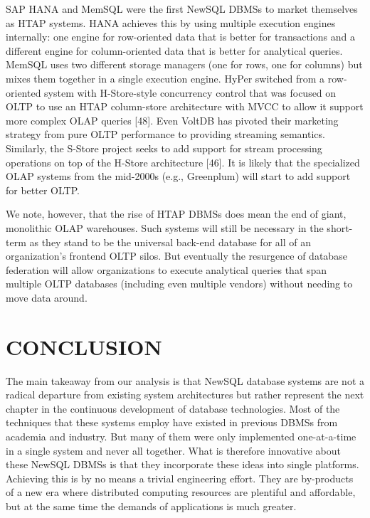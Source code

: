 \documentclass[a4paper,12pt,notitlepage,twoside,openright]{article}
\begin{document}
SAP HANA and MemSQL were the first NewSQL DBMSs to market themselves as
HTAP systems. HANA achieves this by using multiple execution engines
internally: one engine for row-oriented data that is better for
transactions and a different engine for column-oriented data that is
better for analytical queries. MemSQL uses two different storage
managers (one for rows, one for columns) but mixes them together in a
single execution engine. HyPer switched from a row-oriented system with
H-Store-style concurrency control that was focused on
OLTP to use an HTAP column-store architecture with MVCC to allow it
support more complex OLAP queries {[}48{]}. Even VoltDB has pivoted
their marketing strategy from pure OLTP performance to providing
streaming semantics. Similarly, the S-Store project seeks to add support
for stream processing operations on top of the H-Store architecture
{[}46{]}. It is likely that the specialized OLAP systems from the
mid-2000s (e.g., Greenplum) will start to add support for better OLTP.

We note, however, that the rise of HTAP DBMSs does mean the end of
giant, monolithic OLAP warehouses. Such systems will still be necessary
in the short-term as they stand to be the universal back-end database
for all of an organization's frontend OLTP silos. But eventually the
resurgence of database federation will allow organizations to execute
analytical queries that span multiple OLTP databases (including even
multiple vendors) without needing to move data around.

\hypertarget{conclusion}{%
\section{CONCLUSION}\label{conclusion}}

The main takeaway from our analysis is that NewSQL database systems are
not a radical departure from existing system architectures but rather
represent the next chapter in the continuous development of database
technologies. Most of the techniques that these systems employ have
existed in previous DBMSs from academia and industry. But many of them
were only implemented one-at-a-time in a single system and never all
together. What is therefore innovative about these NewSQL DBMSs is that
they incorporate these ideas into single platforms. Achieving this is by
no means a trivial engineering effort. They are by-products of a new era
where distributed computing resources are plentiful and affordable, but
at the same time the demands of applications is much greater.
\end{document}
